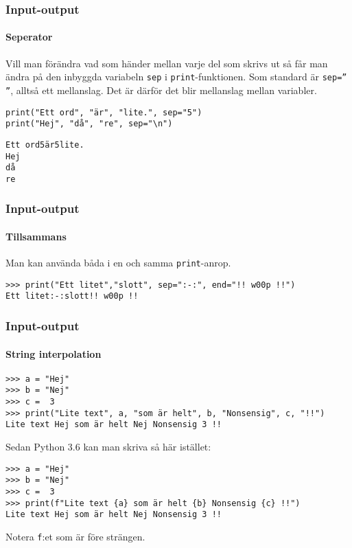\documentclass{beamer}
\begin{document}
\begin{frame}[fragile]
\frametitle{Input-output}
\framesubtitle{Seperator}

Vill man förändra vad som händer mellan varje del som skrivs ut så får man ändra på den inbyggda variabeln \texttt{sep} i \texttt{print}-funktionen. Som standard är \texttt{sep='' ''}, alltså ett mellanslag. Det är därför det blir mellanslag mellan variabler.

\begin{lstlisting}
print("Ett ord", "är", "lite.", sep="5")
print("Hej", "då", "re", sep="\n")
\end{lstlisting}

\begin{lstlisting}
Ett ord5är5lite.
Hej
då
re
\end{lstlisting}

\end{frame}

\begin{frame}[fragile]
\frametitle{Input-output}
\framesubtitle{Tillsammans}

Man kan använda båda i en och samma \texttt{print}-anrop.

\begin{lstlisting}
>>> print("Ett litet","slott", sep=":-:", end="!! w00p !!")
Ett litet:-:slott!! w00p !!
\end{lstlisting}

\end{frame}

\begin{frame}[fragile]
\frametitle{Input-output}
\framesubtitle{String interpolation}

\begin{lstlisting}
>>> a = "Hej"
>>> b = "Nej"
>>> c =  3
>>> print("Lite text", a, "som är helt", b, "Nonsensig", c, "!!")
Lite text Hej som är helt Nej Nonsensig 3 !!
\end{lstlisting}

Sedan Python 3.6 kan man skriva så här istället:

\begin{lstlisting}
>>> a = "Hej"
>>> b = "Nej"
>>> c =  3
>>> print(f"Lite text {a} som är helt {b} Nonsensig {c} !!")
Lite text Hej som är helt Nej Nonsensig 3 !!
\end{lstlisting}

Notera \texttt{f}:et som är före strängen.

\end{frame}
\end{document}

